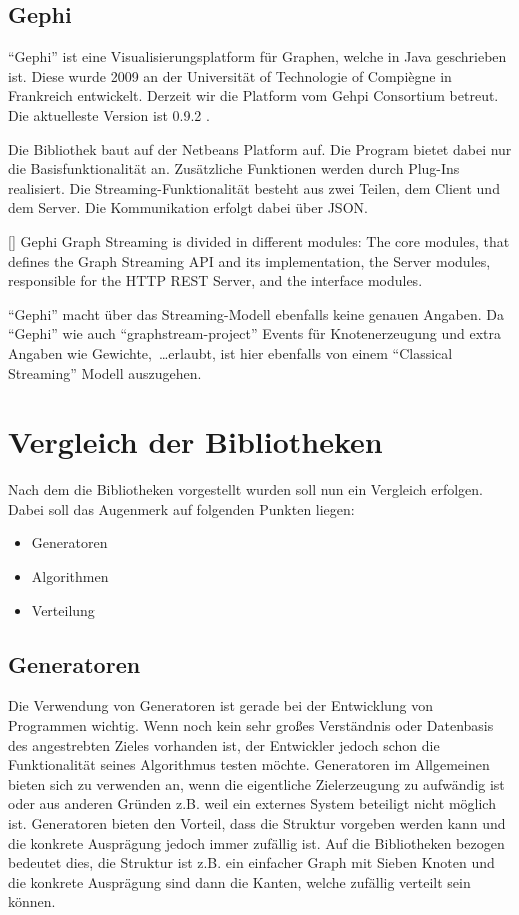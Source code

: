 \subsection{Gephi}
\enquote{Gephi} ist eine Visualisierungsplatform für Graphen, welche in Java
geschrieben ist. Diese wurde 2009 an der Universität of Technologie of Compiègne
in Frankreich entwickelt. Derzeit wir die Platform vom Gehpi Consortium betreut.
Die aktuelleste Version ist 0.9.2 .

Die Bibliothek baut auf der Netbeans Platform auf. Die Program bietet dabei nur
die Basisfunktionalität an. Zusätzliche Funktionen werden durch Plug-Ins
realisiert. Die Streaming-Funktionalität besteht aus zwei Teilen, dem Client und
dem Server. Die Kommunikation erfolgt dabei über \gls{JSON}.

[\cite{Bastian2009}]{
Gephi Graph Streaming is divided in different modules: The core modules, that
defines the Graph Streaming API and its implementation, the Server modules,
responsible for the HTTP REST Server, and the interface modules. 
}

\enquote{Gephi} macht über das Streaming-Modell ebenfalls keine genauen Angaben.
Da \enquote{Gephi} wie auch \enquote{graphstream-project} Events für
Knotenerzeugung und extra Angaben wie Gewichte,~\dots erlaubt, ist hier
ebenfalls von einem \enquote{Classical Streaming} Modell auszugehen.

\section{Vergleich der Bibliotheken}
Nach dem die Bibliotheken vorgestellt wurden soll nun ein Vergleich erfolgen.
Dabei soll das Augenmerk auf folgenden Punkten liegen:

\begin{itemize}
\item Generatoren
\item Algorithmen
\item Verteilung
\end{itemize}

\subsection{Generatoren}
Die Verwendung von Generatoren ist gerade bei der Entwicklung von Programmen
wichtig. Wenn noch kein sehr großes Verständnis oder Datenbasis des angestrebten
Zieles vorhanden ist, der Entwickler jedoch schon die Funktionalität seines
Algorithmus testen möchte. Generatoren im Allgemeinen bieten sich zu verwenden
an, wenn die eigentliche Zielerzeugung zu aufwändig ist oder aus anderen Gründen
z.B. weil ein externes System beteiligt nicht möglich ist. Generatoren bieten den
Vorteil, dass die Struktur vorgeben werden kann und die konkrete Ausprägung jedoch
immer zufällig ist. Auf die Bibliotheken bezogen bedeutet dies, die Struktur ist
z.B. ein einfacher Graph mit Sieben Knoten und die konkrete Ausprägung sind dann
die Kanten, welche zufällig verteilt sein können.

